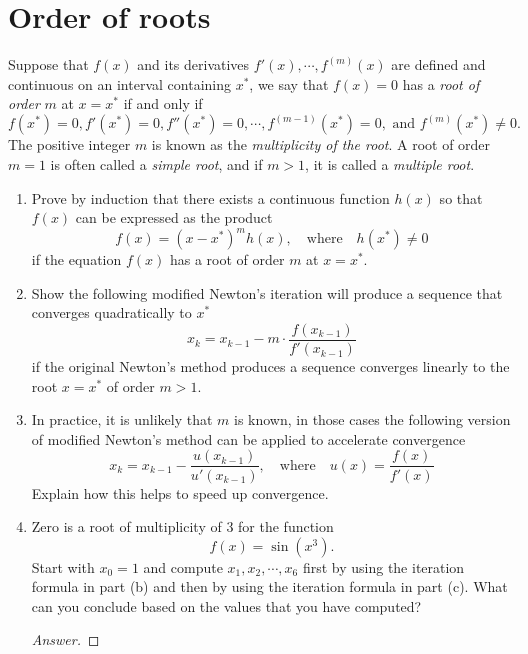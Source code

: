 \section{Order of roots}
Suppose that \(f(x)\) and its derivatives \(f'(x),\cdots, f^{(m)}(x)\) are defined and continuous on an interval containing $x^*$, we say that \(f(x)=0\) has a \emph{root of order} $m$ at \(x=x^*\) if and only if
\[ f(x^*)=0, f'(x^*)=0, f''(x^*)=0, \cdots, f^{(m-1)}(x^*)=0, \text{ and } f^{(m)}(x^*)\neq0. \]
The positive integer $m$ is known as the \emph{multiplicity of the root}.
A root of order \(m=1\) is often called a \emph{simple root}, and if \(m>1\), it is called a \emph{multiple root}.
\begin{enumerate}
	\item Prove by induction that there exists a continuous function \(h(x)\) so that \(f(x)\) can be expressed as the product
	\[ f(x)=(x-x^*)^m h(x), \quad \text{where} \quad h(x^*)\neq0 \]
	if the equation \(f(x)\) has a root of order $m$ at \(x=x^*\).
	\item Show the following modified Newton's iteration will produce a sequence that converges quadratically to $x^*$
	\[ x_k=x_{k-1}-m\cdot\frac{f(x_{k-1})}{f'(x_{k-1})} \]
	if the original Newton's method produces a sequence converges linearly to the root \(x=x^*\) of order \(m>1\).
	\item In practice, it is unlikely that $m$ is known, in those cases the following version of modified Newton's method can be applied to accelerate convergence
	\[ x_k=x_{k-1}-\frac{u(x_{k-1})}{u'(x_{k-1})}, \quad \text{where} \quad u(x)=\frac{f(x)}{f'(x)} \]
	Explain how this helps to speed up convergence.
	\item Zero is a root of multiplicity of 3 for the function
	\[ f(x)=\sin(x^3). \]
	Start with \(x_0=1\) and compute \(x_1, x_2, \cdots, x_6\) first by using the iteration formula in part (b) and then by using the iteration formula in part (c).
	What can you conclude based on the values that you have computed?
	\begin{proof}[Answer]


\end{proof}
\end{enumerate}
